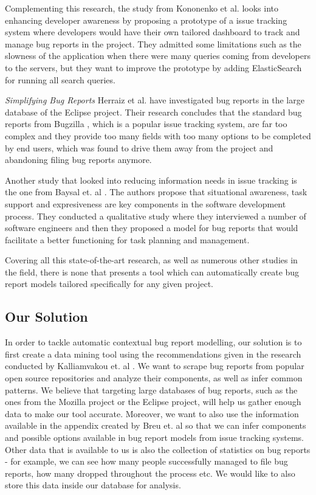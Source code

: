 \documentclass[11pt,english,twocolumn]{article}
\begin{document}
Complementing this research, the study from Kononenko et al. \cite{kononenko2014dashboards} 
looks into enhancing developer awareness by proposing a prototype of a issue tracking system
where developers would have their own tailored dashboard to track and manage bug reports in
the project. They admitted some limitations such as the slowness of the application when there
were many queries coming from developers to the servers, but they want to improve the prototype
by adding ElasticSearch \cite{elasticsearch} for running all search queries.

\emph{Simplifying Bug Reports} Herraiz et al. \cite{herraiz2008towards} have investigated
bug reports in the large database of the Eclipse project. Their research concludes that
the standard bug reports from Bugzilla \cite{bugzilla}, which is a popular issue tracking system,
are far too complex and they provide too many fields with too many options to be completed 
by end users, which was found to drive them away from the project and abandoning filing bug 
reports anymore. 

Another study that looked into reducing information needs in issue tracking is the one from
Baysal et. al \cite{baysal2014no}. The authors propose that situational awareness, task 
support and expresiveness are key components in the software development process. They 
conducted a qualitative study where they interviewed a number of software engineers and 
then they proposed a model for bug reports that would facilitate a better functioning for 
task planning and management. 

Covering all this state-of-the-art research, as well as numerous other studies in the field,
there is none that presents a tool which can automatically create bug report models
tailored specifically for any given project.

\subsection*{Our Solution}

In order to tackle automatic contextual bug report modelling, our solution is to first 
create a data mining tool using the recommendations given in the research conducted by 
Kalliamvakou et. al \cite{kalliamvakou2014promises}. We want to scrape bug reports from popular 
open source repositories and analyze their components, as well as infer common patterns. We believe that targeting 
large databases of bug reports, such as the ones from the Mozilla project or the Eclipse project,
will help us gather enough data to make our tool accurate. Moreover, we want to also use the
information available in the appendix created by Breu et. al \cite{breu2009appendix} 
so that we can infer components and possible options available in bug report models from
issue tracking systems. Other data that is available to us is also the collection of 
statistics on bug reports - for example, we can see how many people successfully managed
to file bug reports, how many dropped throughout the process etc. We would like to also 
store this data inside our database for analysis.
\end{document}
